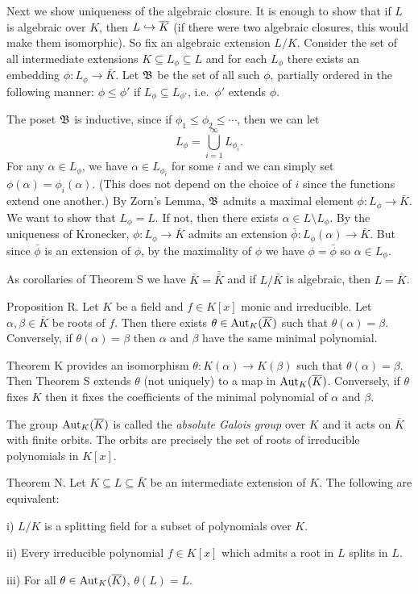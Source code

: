 Next we show uniqueness of the algebraic closure. It is enough to show that if $L$ is algebraic over $K$, then $L\hookrightarrow \overline K$ (if there were two algebraic closures, this would make them isomorphic). So fix an algebraic extension $L/K$. Consider the set of all intermediate extensions $K\subseteq L_\phi\subseteq L$ and for each $L_\phi$ there exists an embedding $\phi : L_\phi \to \bar K$. Let $\frak B$ be the set of all such $\phi$, partially ordered in the following manner: $\phi \leq \phi'$ if $L_\phi \subseteq L_{\phi'}$, i.e.\ $\phi'$ extends $\phi$.

The poset $\frak B$ is inductive, since if $\phi_1 \leq \phi_2 \leq \cdots$, then we can let
$$L_\phi = \bigcup_{i=1}^\infty L_{\phi_i}.$$
For any $\alpha\in L_\phi$, we have $\alpha\in L_{\phi_i}$ for some $i$ and we can simply set $\phi(\alpha) = \phi_i(\alpha)$. (This does not depend on the choice of $i$ since the functions extend one another.) By Zorn's Lemma, $\frak B$ admits a maximal element $\phi : L_\phi \to \bar K$. We want to show that $L_\phi = L$. If not, then there exists $\alpha\in L\setminus L_\phi$. By the uniqueness of Kronecker, $\phi: L_\phi \to \bar K$ admits an extension $\bar\phi : L_\phi(\alpha) \to \bar K$. But since $\bar \phi$ is an extension of $\phi$, by the maximality of $\phi$ we have $\phi= \bar\phi$ so $\alpha\in L_\phi$.\slug

As corollaries of Theorem S we have $\bar K = \bar{\bar K}$ and if $L/\bar K$ is algebraic, then $L = \bar K$.

\proclaim Proposition R. Let $K$ be a field and $f\in K[x]$ monic and irreducible. Let $\alpha,\beta\in \bar K$ be roots of $f$. Then there exists $\theta\in \mathop {\rm Aut}_K(\overline K)$ such that $\theta(\alpha) = \beta$. Conversely, if $\theta(\alpha) = \beta$ then $\alpha$ and $\beta$ have the same minimal polynomial.

\proof Theorem K provides an isomorphism $\theta : K(\alpha) \to K(\beta)$ such that $\theta(\alpha) = \beta$. Then Theorem S extends $\theta$ (not uniquely) to a map in $\mathop {\rm Aut}_K(\overline K)$. Conversely, if $\theta$ fixes $K$ then it fixes the coefficients of the minimal polynomial of $\alpha$ and $\beta$.\slug

The group $\mathop {\rm Aut}_K(\overline K)$ is called the {\it absolute Galois group} over $K$ and it acts on $\bar K$ with finite orbits. The orbits are precisely the set of roots of irreducible polynomials in $K[x]$.

\proclaim Theorem N. Let $K \subseteq L\subseteq \bar K$ be an intermediate extension of $K$. The following are equivalent:
\medskip
\item{i)} $L/K$ is a splitting field for a subset of polynomials over $K$.
\smallskip
\item{ii)} Every irreducible polynomial $f\in K[x]$ which admits a root in $L$ splits in $L$.
\smallskip
\item{iii)} For all $\theta\in \mathop {\rm Aut}_K(\overline K)$, $\theta(L) = L$.
\medskip

